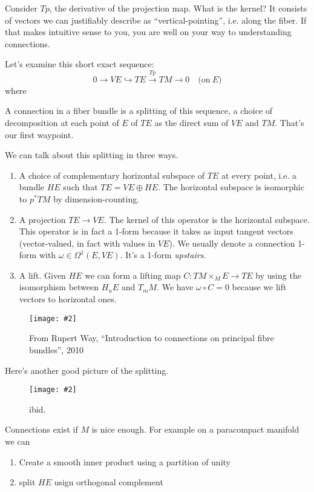 \documentclass[12pt]{article}
\newcommand{\myfig}[2]{\begin{figure}[h]\caption{#1}\centering\texttt{[image: \#2]}\end{figure}}
\begin{document}
Consider $Tp$, the derivative of the projection map. What is the kernel? It consists of vectors we can justifiably describe as ``vertical-pointing'', i.e. along the fiber. If that makes intuitive sense to you, you are well on your way to understanding connections.

Let's examine this short exact sequence:
\begin{equation}\label{seq}
    0\to VE\hookrightarrow TE \xrightarrow{Tp} TM\to 0\quad\mathrm{(on\ }E)
\end{equation}
where

A connection in a fiber bundle is a splitting of this sequence, a choice of decomposition at each point of $E$ of $TE$ as the direct sum of $VE$ and $TM$. That's our first waypoint.

We can talk about this splitting in three ways.

\begin{enumerate}
    \item A choice of complementary horizontal subspace of $TE$ at every point, i.e. a bundle $HE$ such that $TE=VE\oplus HE$. The horizontal subspace is isomorphic to $p^* TM$ by dimension-counting.
    
    \item A projection $TE\to VE$. The kernel of this operator is the horizontal subspace. This operator is in fact a 1-form because it takes as input tangent vectors (vector-valued, in fact with values in $VE$). We usually denote a connection 1-form with $\omega\in\Omega^1(E, VE)$. It's a 1-form \emph{upstairs}.
    
    \item A lift. Given $HE$ we can form a lifting map $C:TM\times_M E \to TE$ by using the isomorphism between $H_u E$ and $T_{m} M$. We have $\omega\circ C = 0$ because we lift vectors to horizontal ones.
\end{enumerate}

\myfig{From Rupert Way, ``Introduction to connections on principal fibre bundles'', 2010}{way_horiz_field}

Here's another good picture of the splitting.

\myfig{ibid.}{way_upstairs}

Connections exist if $M$ is nice enough. For example on a paracompact manifold we can 
\begin{enumerate}
	\item Create a smooth inner product using a partition of unity
	\item split $HE$ usign orthogonal complement
\end{enumerate}
\end{document}
